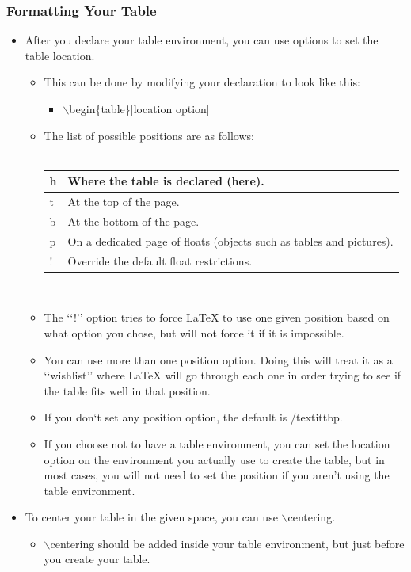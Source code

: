 \documentclass{article}
\begin{document}
			\subsubsection{Formatting Your Table}
				\begin{itemize}
					\item After you declare your table environment, you can use options to set the table location.
					\begin{itemize}
						\item This can be done by modifying your declaration to look like this:
						\begin{itemize}
							\item $\backslash$begin\{table\}[location option]
						\end{itemize}
						\item The list of possible positions are as follows:\\\\
						\def\arraystretch{1.4}
						\begin{tabularx}{\textwidth}{| l | X |}
							\hline
							h & Where the table is declared (here).\\
							\hline
							t & At the top of the page.\\
							\hline
							b & At the bottom of the page.\\
							\hline
							p & On a dedicated page of floats (objects such as tables and pictures).\\
							\hline
							! & Override the default float restrictions.\\
							\hline
						\end{tabularx}\\
						\item The \lq\lq{}!\rq\rq{} option tries to force \LaTeX{} to use one given position based on what option you chose, but will not force it if it is impossible.
						\item You can use more than one position option. Doing this will treat it as a \lq\lq{}wishlist\rq\rq{} where \LaTeX{} will go through each one in order trying to see if the table fits well in that position.
						\item If you don\lq{}t set any position option, the default is /textit{tbp}.
						\item If you choose not to have a table environment, you can set the location option on the environment you actually use to create the table, but in most cases, you will not need to set the position if you aren\rq{}t using the table environment.
					\end{itemize}
					\item To center your table in the given space, you can use $\backslash$centering.
					\begin{itemize}
						\item $\backslash$centering should be added inside your table environment, but just before you create your table.
					\end{itemize}


\end{itemize}
\end{document}
